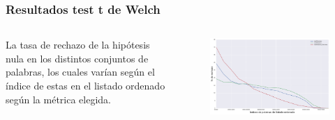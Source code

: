 \begin{frame}[t]\frametitle{Resultados test t de Welch}

    \begin{columns}[t]
    
        \begin{column}{.3\textwidth}
        La tasa de rechazo de la hipótesis nula en los distintos conjuntos de palabras, los cuales varían según el índice de estas en el listado ordenado según la métrica elegida. 
        \end{column}
        
        \begin{column}{.6\textwidth}
        
            \begin{figure}
            \includegraphics[width=0.95\linewidth]{../src/images/rechazo_metricas.pdf}
            \label{fig:rechazo_metricas}
            \end{figure} 
        \end{column}
    \end{columns}

\end{frame}